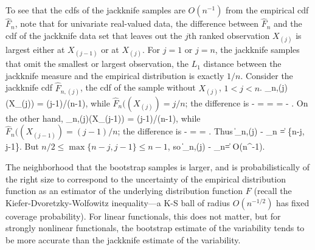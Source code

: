 To see that the cdfs of the jackknife samples are $O(n^{-1})$ from the
empirical cdf $\hat{F}_n$, note that for univariate real-valued data, the difference
between $\hat{F}_n$ and the cdf of the jackknife data set that
leaves out the $j$th ranked observation $X_{(j)}$ is largest either at $X_{(j-1)}$ or
at $X_{(j)}$.
For $j = 1$ or $j = n$, the jackknife
samples that omit the smallest or largest observation, the $L_1$
distance between the jackknife measure and the empirical distribution
is exactly $1/n$.
Consider the jackknife cdf $\hat{F}_{n,(j)}$, the cdf of the sample without $X_{(j)}$,
$1 < j < n$.
\beq
    _{n,(j)}(X_{(j)}) = (j-1)/(n-1),
\eeq
while $\hat{F}_n((X_{(j)}) = j/n$; the difference is
\beq
     -  =  =
     =  - .
\eeq
On the other hand,
\beq
    _{n,(j)}(X_{(j-1)}) = (j-1)/(n-1),
\eeq
while $\hat{F}_n((X_{(j-1)})= (j-1)/n$; the difference is
\beq
     -  =  =
    .
\eeq
Thus
\beq
    \| _{n,(j)} - _{n} \| =  \max\{n-j, j-1\}.
\eeq
But $n/2 \le \max\{n-j, j-1\} \le n-1$, so
\beq
    \| _{n,(j)} - _n\| = O(n^{-1}).
\eeq

The neighborhood that the bootstrap samples is larger, and is
probabilistically of the right size to correspond to the uncertainty
of the empirical distribution function as an estimator of the
underlying distribution function $F$ (recall the
Kiefer-Dvoretzky-Wolfowitz inequality---a K-S ball of radius $O(n^{-1/2})$
has fixed coverage probability).
For linear functionals, this does not matter, but for strongly nonlinear
functionals, the bootstrap estimate of the variability tends to be more accurate than
the jackknife estimate of the variability.

